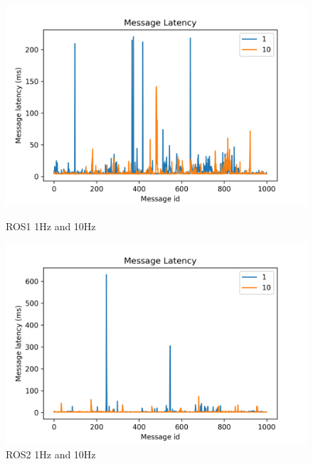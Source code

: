 \documentclass{mproj}
\begin{document}
\begin{figure}
\begin{minipage}[h]{0.5\linewidth}
\centering
\includegraphics[width = 1\textwidth]{low.png}
\caption{ROS1 1Hz and 10Hz}
\label{fig:side:a}
\end{minipage}%
\begin{minipage}[h]{0.5\linewidth}
\centering
\includegraphics[width = 1\textwidth]{low2.png}
\caption{ROS2 1Hz and 10Hz}
\label{fig:side:b}
\end{minipage}
\end{figure}
\end{document}
